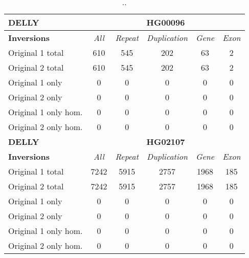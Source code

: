 \begin{table}[htb]
\caption{ .. }
\begin{center}
\begin{tabular}{|l|c||c|c|c|c|}
\hline
{\bf DELLY} & \multicolumn{5}{|c|}{\bf HG00096} \\
\hline
\cline{2-6}
{\bf Inversions} & {\it All} & {\it Repeat} & {\it Duplication} & {\it Gene} & {\it Exon} \\
\hline
Original 1 total & 610 & 545 & 202 & 63 & 2\\ 
\hline
Original 2 total & 610 & 545 & 202 & 63 & 2\\ 
\hline
Original 1 only & 0 & 0 & 0 & 0 & 0\\ 
\hline
Original 2 only & 0 & 0 & 0 & 0 & 0\\ 
\hline
Original 1 only hom. & 0 & 0 & 0 & 0 & 0\\ 
\hline
Original 2 only hom. & 0 & 0 & 0 & 0 & 0\\ 
\hline
\hline
{\bf DELLY} & \multicolumn{5}{|c|}{\bf HG02107} \\
\hline
\cline{2-6}
{\bf Inversions} & {\it All} & {\it Repeat} & {\it Duplication} & {\it Gene} & {\it Exon} \\
\hline
Original 1 total & 7242 & 5915 & 2757 & 1968 & 185\\ 
\hline
Original 2 total & 7242 & 5915 & 2757 & 1968 & 185\\ 
\hline
Original 1 only & 0 & 0 & 0 & 0 & 0\\ 
\hline
Original 2 only & 0 & 0 & 0 & 0 & 0\\ 
\hline
Original 1 only hom. & 0 & 0 & 0 & 0 & 0\\ 
\hline
Original 2 only hom. & 0 & 0 & 0 & 0 & 0\\ 
\hline
\end{tabular}
\end{center}
\label{tab:orig-vs-orig2-delly-inv}
\end{table}

